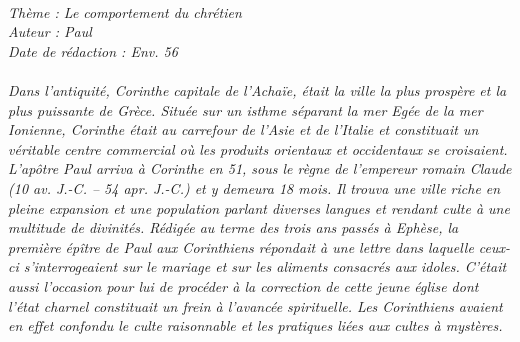 \BFont
\noindent\hrulefill
{\footnotesize
\textit{
\bigskip
{\centering{}
\\Thème : Le comportement du chrétien
\\Auteur : Paul
\\Date de rédaction : Env. 56\\}
}
\textit{
\\Dans l’antiquité, Corinthe capitale de l’Achaïe, était la ville la plus prospère et la plus puissante de Grèce. Située sur un isthme séparant la mer Egée de la mer Ionienne, Corinthe était au carrefour de l’Asie et de l’Italie et constituait un véritable centre commercial où les produits orientaux et occidentaux se croisaient.
\\L’apôtre Paul arriva à Corinthe en 51, sous le règne de l’empereur romain Claude (10 av. J.-C. – 54 apr. J.-C.) et y demeura 18 mois. Il trouva une ville riche en pleine expansion et une population parlant diverses langues et rendant culte à une multitude de divinités. Rédigée au terme des trois ans passés à Ephèse, la première épître de Paul aux Corinthiens répondait à une lettre dans laquelle ceux-ci s’interrogeaient sur le mariage et sur les aliments consacrés aux idoles. C’était aussi l’occasion pour lui de procéder à la correction de cette jeune église dont l’état charnel constituait un frein à l’avancée spirituelle. Les Corinthiens avaient  en effet confondu le culte raisonnable et les pratiques liées aux cultes à mystères.\bigskip
}
}
\par\nobreak\noindent\hrulefill

